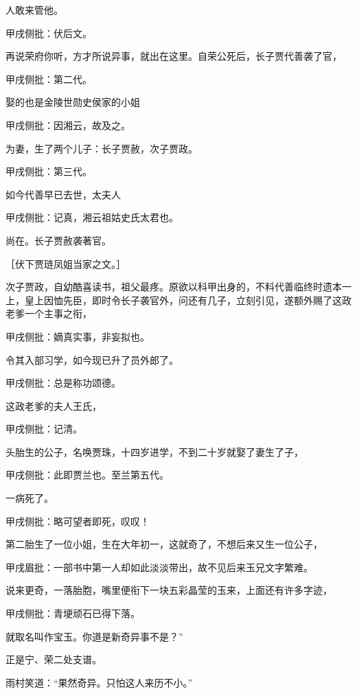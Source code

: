 \begin{parag}
人敢来管他。\begin{note}甲戌侧批：伏后文。\end{note}再说荣府你听，方才所说异事，就出在这里。自荣公死后，长子贾代善袭了官，\begin{note}甲戌侧批：第二代。\end{note}娶的也是金陵世勋史侯家的小姐\begin{note}甲戌侧批：因湘云，故及之。\end{note}为妻，生了两个儿子：长子贾赦，次子贾政。\begin{note}甲戌侧批：第三代。\end{note}如今代善早已去世，太夫人\begin{note}甲戌侧批：记真，湘云祖姑史氏太君也。\end{note}尚在。长子贾赦袭著官。\begin{note}［伏下贾琏凤姐当家之文。］\end{note}次子贾政，自幼酷喜读书，祖父最疼。原欲以科甲出身的，不料代善临终时遗本一上，皇上因恤先臣，即时令长子袭官外，问还有几子，立刻引见，遂额外赐了这政老爹一个主事之衔，\begin{note}甲戌侧批：嫡真实事，非妄拟也。\end{note}令其入部习学，如今现已升了员外郎了。\begin{note}甲戌侧批：总是称功颂德。\end{note}这政老爹的夫人王氏，\begin{note}甲戌侧批：记清。\end{note}头胎生的公子，名唤贾珠，十四岁进学，不到二十岁就娶了妻生了子，\begin{note}甲戌侧批：此即贾兰也。至兰第五代。\end{note}一病死了。\begin{note}甲戌侧批：略可望者即死，叹叹！\end{note}第二胎生了一位小姐，生在大年初一，这就奇了，不想后来又生一位公子，\begin{note}甲戌眉批：一部书中第一人却如此淡淡带出，故不见后来玉兄文字繁难。\end{note}说来更奇，一落胎胞，嘴里便衔下一块五彩晶莹的玉来，上面还有许多字迹，\begin{note}甲戌侧批：青埂顽石已得下落。\end{note}就取名叫作宝玉。你道是新奇异事不是？”\begin{note}正是宁、荣二处支谱。\end{note}
\end{parag}


\begin{parag}
    雨村笑道：“果然奇异。只怕这人来历不小。”
\end{parag}



